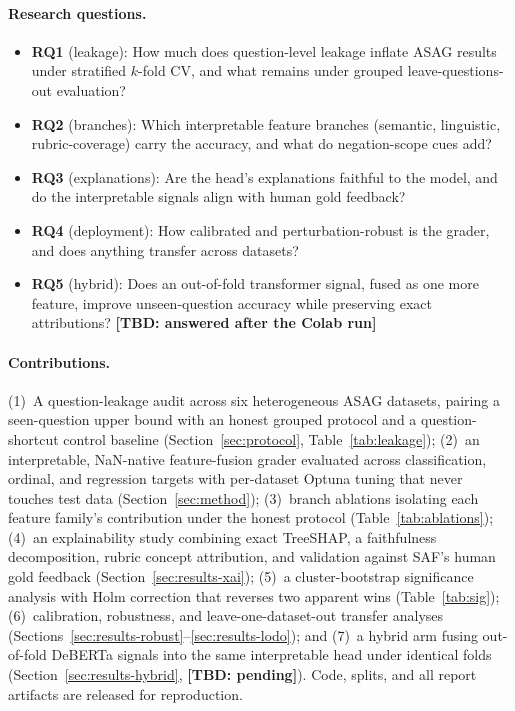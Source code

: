 \documentclass[11pt]{article}
\newcommand{\TBD}[1]{\textbf{[TBD: #1]}}
\begin{document}
\paragraph{Research questions.}
\begin{itemize}
  \item \textbf{RQ1} (leakage): How much does question-level leakage inflate
        ASAG results under stratified $k$-fold CV, and what remains under
        grouped leave-questions-out evaluation?
  \item \textbf{RQ2} (branches): Which interpretable feature branches
        (semantic, linguistic, rubric-coverage) carry the accuracy, and what do
        negation-scope cues add?
  \item \textbf{RQ3} (explanations): Are the head's explanations faithful to
        the model, and do the interpretable signals align with human gold
        feedback?
  \item \textbf{RQ4} (deployment): How calibrated and perturbation-robust is
        the grader, and does anything transfer across datasets?
  \item \textbf{RQ5} (hybrid): Does an out-of-fold transformer signal, fused as
        one more feature, improve unseen-question accuracy while preserving
        exact attributions? \TBD{answered after the Colab run}
\end{itemize}

\paragraph{Contributions.}
(1)~A question-leakage audit across six heterogeneous ASAG datasets, pairing a
seen-question upper bound with an honest grouped protocol and a
question-shortcut control baseline (Section~\ref{sec:protocol},
Table~\ref{tab:leakage}); (2)~an interpretable, NaN-native feature-fusion
grader evaluated across classification, ordinal, and regression targets with
per-dataset Optuna tuning that never touches test data
(Section~\ref{sec:method}); (3)~branch ablations isolating each feature
family's contribution under the honest protocol (Table~\ref{tab:ablations});
(4)~an explainability study combining exact TreeSHAP, a faithfulness
decomposition, rubric concept attribution, and validation against SAF's human
gold feedback (Section~\ref{sec:results-xai}); (5)~a cluster-bootstrap
significance analysis with Holm correction that reverses two apparent wins
(Table~\ref{tab:sig}); (6)~calibration, robustness, and leave-one-dataset-out
transfer analyses (Sections~\ref{sec:results-robust}--\ref{sec:results-lodo});
and (7)~a hybrid arm fusing out-of-fold DeBERTa signals into the same
interpretable head under identical folds (Section~\ref{sec:results-hybrid},
\TBD{pending}). Code, splits, and all report artifacts are released for
reproduction.
\end{document}
